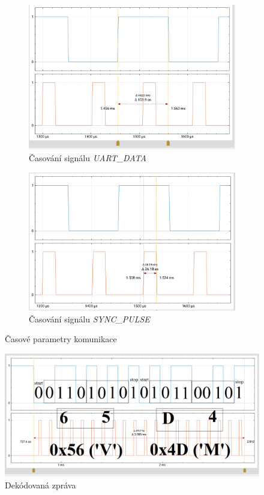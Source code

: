 \documentclass[twoside]{article}
\begin{document}
\begin{figure}[htbp]
    \centering %
\begin{subfigure}{0.45\textwidth}
  \includegraphics[width=\linewidth]{bit_detail.png}
  \caption{Časování signálu \textit{UART\_DATA}}
\end{subfigure}\hfil %
\begin{subfigure}{0.45\textwidth}
	\includegraphics[width=\linewidth]{sync_detail.png}
	\caption{Časování signálu \textit{SYNC\_PULSE}}
\end{subfigure}
\caption{Časové parametry komunikace}
\label{fig:timing}
\end{figure}

\begin{figure}[htbp]
    \includegraphics[width=\linewidth]{decoded.png}
    \caption{Dekódovaná zpráva}
    \label{fig:decoded}
\end{figure}
\end{document}
